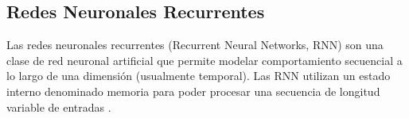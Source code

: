 \subsection{Redes Neuronales Recurrentes}

Las redes neuronales recurrentes (Recurrent Neural Networks, RNN) son una clase 
de red neuronal artificial que permite modelar comportamiento secuencial a lo 
largo de una dimensión (usualmente temporal). Las RNN utilizan un estado interno 
denominado memoria para poder procesar una secuencia de longitud variable de 
entradas \cite{Abiodun2018}.



